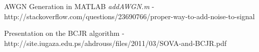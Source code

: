 \documentclass[paper=a4, fontsize=12pt]{scrartcl} %
\numberwithin{equation}{section} %
\numberwithin{figure}{section} %
\numberwithin{table}{section} %
\begin{document}
\begin{thebibliography}{155}
AWGN Generation in MATLAB \textit{addAWGN.m} - \\
http://stackoverflow.com/questions/23690766/proper-way-to-add-noise-to-signal

Presentation on the BCJR algorithm - \\
http://site.iugaza.edu.ps/ahdrouss/files/2011/03/SOVA-and-BCJR.pdf
\end{thebibliography}
\end{document}

